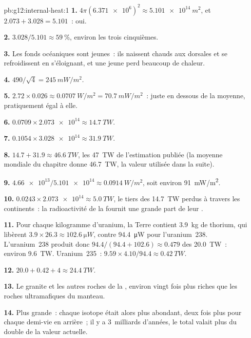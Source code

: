 \begin{solution}{pb:g12:internal-heat:1}
\textbf{1.} $4\pi (\num{6.371e6})^2 \approx \qty{5.101e14}{m^2}$, et
$2.073 + 3.028 = 5.101$~: oui.

\textbf{2.} $3.028/5.101 \approx \qty{59}{\percent}$, environ les trois
cinquièmes.

\textbf{3.} Les fonds océaniques sont jeunes~: ils naissent chauds aux
dorsales et se refroidissent en s'éloignant, et une  jeune perd
beaucoup de chaleur.

\textbf{4.} $490/\sqrt{4} = \qty{245}{mW/m^2}$.

\textbf{5.} $2.72 \times 0.026 \approx \qty{0.0707}{W/m^2} =
\qty{70.7}{mW/m^2}$~: juste en dessous de la moyenne, pratiquement égal à
elle.

\textbf{6.} $0.0709 \times \num{2.073e14} \approx \qty{14.7}{TW}$.

\textbf{7.} $0.1054 \times \num{3.028e14} \approx \qty{31.9}{TW}$.

\textbf{8.} $14.7 + 31.9 \approx \qty{46.6}{TW}$, les \qty{47}{TW} de
l'estimation publiée (la moyenne mondiale du chapitre donne
\qty{46.7}{TW}, la valeur utilisée dans la suite).

\textbf{9.} $\num{4.66e13}/\num{5.101e14} \approx \qty{0.0914}{W/m^2}$,
soit environ \qty{91}{mW/m^2}.

\textbf{10.} $0.0243 \times \num{2.073e14} \approx \qty{5.0}{TW}$, le tiers
des \qty{14.7}{TW} perdus à travers les continents~: la radioactivité de la
 fournit une grande part de leur .

\textbf{11.} Pour chaque kilogramme d'uranium, la Terre contient
\qty{3.9}{kg} de thorium, qui libèrent $3.9 \times 26.3 \approx \qty{102.6}{\micro W}$,
contre \qty{94.4}{\micro W} pour l'uranium~238. L'uranium~238 produit donc
$94.4/(94.4 + 102.6) \approx 0.479$ des \qty{20.0}{TW}~: environ
\qty{9.6}{TW}. Uranium~235~: $9.59 \times 4.10/94.4 \approx \qty{0.42}{TW}$.

\textbf{12.} $20.0 + 0.42 + 4 \approx \qty{24.4}{TW}$.

\textbf{13.} Le granite et les autres roches de la ,
environ vingt fois plus riches que les roches ultramafiques du manteau.

\textbf{14.} Plus grande~: chaque isotope était alors plus abondant, deux
fois plus pour chaque demi-vie en arrière~; il y a 3~milliards d'années,
le total valait plus du double de la valeur actuelle.


\end{solution}
